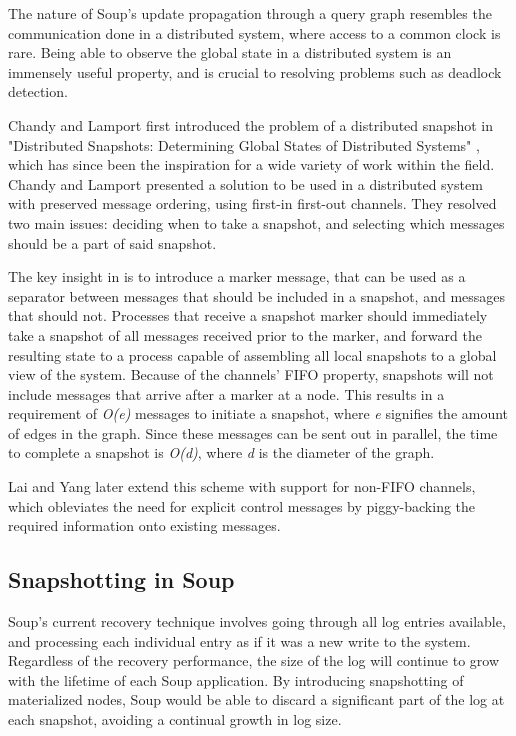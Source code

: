 \documentclass[b5paper]{report}
\begin{document}
The nature of Soup's update propagation through a query graph resembles the
communication done in a distributed system, where access to a common clock is
rare. Being able to observe the global state in a distributed system is an
immensely useful property, and is crucial to resolving problems such as deadlock
detection.

Chandy and Lamport first introduced the problem of a distributed snapshot in
"Distributed Snapshots: Determining Global States of Distributed Systems"
\cite{chandy-lamport}, which has since been the inspiration for a wide variety
of work within the field. Chandy and Lamport presented a solution to be used in
a distributed system with preserved message ordering, using first-in first-out
channels. They resolved two main issues: deciding when to take a snapshot, and
selecting which messages should be a part of said snapshot.

The key insight in \cite{chandy-lamport} is to introduce a marker message, that
can be used as a separator between messages that should be included in a
snapshot, and messages that should not. Processes that receive a snapshot marker
should immediately take a snapshot of all messages received prior to the marker,
and forward the resulting state to a process capable of assembling all local
snapshots to a global view of the system. Because of the channels' FIFO
property, snapshots will not include messages that arrive after a marker at a
node. This results in a requirement of \textit{O(e)} messages to initiate a
snapshot, where \textit{e} signifies the amount of edges in the graph. Since
these messages can be sent out in parallel, the time to complete a snapshot is
\textit{O(d)}, where \textit{d} is the diameter of the graph.

Lai and Yang \cite{lai-yang} later extend this scheme with support for non-FIFO
channels, which obleviates the need for explicit control messages by piggy-backing
the required information onto existing messages.

\subsection{Snapshotting in Soup}
Soup's current recovery technique involves going through all log entries
available, and processing each individual entry as if it was a new write to the
system. Regardless of the recovery performance, the size of the log will
continue to grow with the lifetime of each Soup application. By introducing
snapshotting of materialized nodes, Soup would be able to discard a significant
part of the log at each snapshot, avoiding a continual growth in log size.
\end{document}
